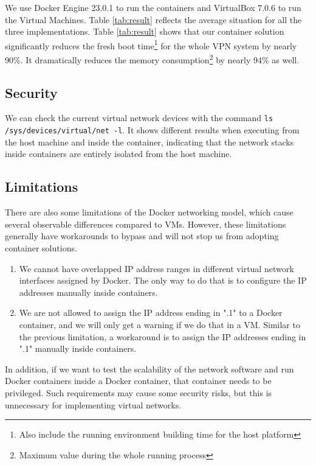 \documentclass[article]{aaltoseries}
\begin{document}
We use Docker Engine 23.0.1 to run the containers and VirtualBox 7.0.6 to run the Virtual Machines. Table \ref{tab:result} reflects the average situation for all the three implementations. Table \ref{tab:result} shows that our container solution significantly reduces the fresh boot time\footnote{Also include the running environment building time for the host platform} for the whole VPN system by nearly 90\%. It dramatically reduces the memory consumption\footnote{Maximum value during the whole running process} by nearly 94\% as well.

\subsection{Security}
We can check the current virtual network devices with the command \texttt{ls /sys/devices/virtual/net -l}. It shows different results when executing from the host machine and inside the container, indicating that the network stacks inside containers are entirely isolated from the host machine.

\subsection{Limitations}

There are also some limitations of the Docker networking model, which cause several observable differences compared to VMs. However, these limitations generally have workarounds to bypass and will not stop us from adopting container solutions.

\begin{enumerate}
\setlength{\itemsep}{0pt}
\setlength{\parsep}{0pt}
\setlength{\parskip}{0pt}
\item We cannot have overlapped IP address ranges in different virtual network interfaces assigned by Docker. The only way to do that is to configure the IP addresses manually inside containers.
\item We are not allowed to assign the IP address ending in ".1" to a Docker container, and we will only get a warning if we do that in a VM. Similar to the previous limitation, a workaround is to assign the IP addresses ending in ".1" manually inside containers.
\end{enumerate}

In addition, if we want to test the scalability of the network software and run Docker containers inside a Docker container, that container needs to be privileged. Such requirements may cause some security risks, but this is unnecessary for implementing virtual networks.
\end{document}
